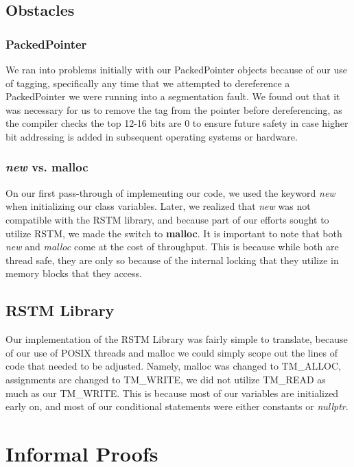 \documentclass[letterpaper, 10 pt, conference]{ieeeconf}
\begin{document}
\subsection{Obstacles}



\subsubsection{PackedPointer}
We ran into problems initially with our PackedPointer objects because of our use of tagging, specifically any time that we attempted to dereference a PackedPointer we were running into a segmentation fault. We found out that it was necessary for us to remove the tag from the pointer before dereferencing, as the compiler checks the top 12-16 bits are 0 to ensure future safety in case higher bit addressing is added in subsequent operating systems or hardware.

\subsubsection{\textit{new} vs. malloc}
On our first pass-through of implementing our code, we used the keyword \textit{new} when initializing our class variables. Later, we realized that \textit{new} was not compatible with the RSTM library, and because part of our efforts sought to utilize RSTM, we made the switch to \textbf{malloc}. It is important to note that both \textit{new} and \textit{malloc} come at the cost of throughput. This is because while both are thread safe, they are only so because of the internal locking that they utilize in memory blocks that they access.


	
\subsection{RSTM Library}
Our implementation of the RSTM Library was fairly simple to translate, because of our use of POSIX threads and malloc we could simply scope out the lines of code that needed to be adjusted. Namely, malloc was changed to TM\_ALLOC, assignments are changed to TM\_WRITE, we did not utilize TM\_READ as much as our TM\_WRITE. This is because most of our variables are initialized early on, and most of our conditional statements were either constants or \textit{nullptr}.

\section{Informal Proofs}
\end{document}
